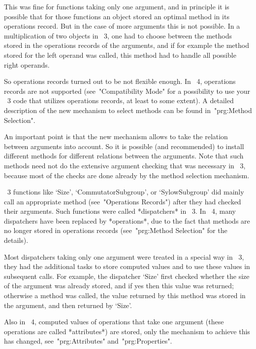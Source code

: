 This was fine for functions taking only one argument,
and in principle it is possible that for those functions an object
stored an optimal method in its operations record.
But in the case of more arguments this is not possible.
In a multiplication of two objects in {\GAP}~3, one had to choose between
the methods stored in the operations records of the arguments,
and if for example the method stored for the left operand was called,
this method had to handle all possible right operands.

So operations records turned out to be not flexible enough.
In {\GAP}~4, operations records are not supported
(see~"Compatibility Mode" for a possibility to use your {\GAP}~3 code
that utilizes operations records, at least to some extent).
A detailed description of the new mechanism to select methods can be
found in~"prg:Method Selection".

An important point is that the new mechanism allows {\GAP} to take the
relation between arguments into account.
So it is possible (and recommended) to install different methods for
different relations between the arguments.
Note that such methods need not do the extensive argument checking
that was necessary in {\GAP}~3, because most of the checks are done
already by the method selection mechanism.



{\GAP}~3 functions like `Size', `CommutatorSubgroup', or `SylowSubgroup'
did mainly call an appropriate method (see~"Operations Records")
after they had checked their arguments.
Such functions were called *dispatchers* in {\GAP}~3.
In {\GAP}~4, many dispatchers have been replaced by *operations*,
due to the fact that methods are no longer stored in operations records
(see~"prg:Method Selection" for the details).

Most dispatchers taking only one argument were treated in a special way
in {\GAP}~3, they had the additional tasks to store computed values
and to use these values in subsequent calls.
For example, the dispatcher `Size' first checked whether the size of the
argument was already stored, and if yes then this value was returned;
otherwise a method was called, the value returned by this method was
stored in the argument, and then returned by `Size'.

Also in {\GAP}~4, computed values of operations that take one argument
(these operations are called *attributes*) are stored,
only the mechanism to achieve this has changed,
see~"prg:Attributes" and~"prg:Properties".

